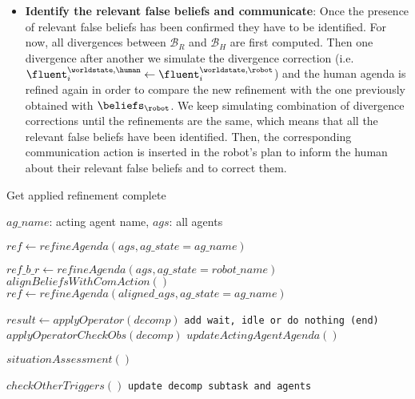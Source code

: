 \begin{itemize}
    \item \textbf{Identify the relevant false beliefs and communicate}: 
    Once the presence of relevant false beliefs has been confirmed they have to be identified. For now, all divergences between $\mathcal{B}_R$ and $\mathcal{B}_H$ are first computed. Then one divergence after another we simulate the divergence correction (i.e. $\fluent_i^{\worldstate, \human} \gets \fluent_i^{\worldstate, \robot}$) and the human agenda is refined again in order to compare the new refinement with the one previously obtained with $\beliefs_\robot$. We keep simulating combination of divergence corrections until the refinements are the same, which means that all the relevant false beliefs have been identified. Then, the corresponding communication action is inserted in the robot's plan to inform the human about their relevant false beliefs and to correct them.
    
\end{itemize}


\begin{algorithm}
\caption{Get applied refinement complete}\label{alg:cacc}
\begin{algorithmic}
\Require $ag\_name$: acting agent name, $ags$: all agents

\State $ref \gets refineAgenda(ags, ag\_state=ag\_name)$

\State $ref\_b\_r \gets refineAgenda(ags, ag\_state=robot\_name)$
 
    \State $alignBeliefsWithComAction()$
    \State $ref \gets refineAgenda(aligned\_ags, ag\_state=ag\_name)$
\EndIf


    \State $result \gets applyOperator(decomp)$ 
        \State \texttt{add wait, idle or do nothing (end)}
    \Else
        \State $applyOperatorCheckObs(decomp)$
        \State $updateActingAgentAgenda()$
        
            \State $situationAssessment()$
        \EndIf
        
        \State $checkOtherTriggers()$
        \State \texttt{update decomp subtask and agents}
    \EndIf
\EndFor

\end{algorithmic}
\end{algorithm}

